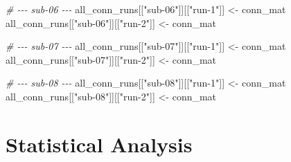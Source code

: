 \documentclass[
]{article}
\newenvironment{Shaded}{\begin{snugshade}}{\end{snugshade}}
\newcommand{\CommentTok}[1]{\textcolor[rgb]{0.56,0.35,0.01}{\textit{#1}}}
\newcommand{\FunctionTok}[1]{\textcolor[rgb]{0.13,0.29,0.53}{\textbf{#1}}}
\newcommand{\NormalTok}[1]{#1}
\newcommand{\OtherTok}[1]{\textcolor[rgb]{0.56,0.35,0.01}{#1}}
\newcommand{\StringTok}[1]{\textcolor[rgb]{0.31,0.60,0.02}{#1}}
\begin{document}
\begin{Shaded}
\begin{Highlighting}[]
\CommentTok{\# {-}{-}{-} sub{-}06 {-}{-}{-}}
\NormalTok{all\_conn\_runs[[}\StringTok{"sub{-}06"}\NormalTok{]][[}\StringTok{"run{-}1"}\NormalTok{]] }\OtherTok{\textless{}{-}}\NormalTok{ conn\_mat}
\NormalTok{all\_conn\_runs[[}\StringTok{"sub{-}06"}\NormalTok{]][[}\StringTok{"run{-}2"}\NormalTok{]] }\OtherTok{\textless{}{-}}\NormalTok{ conn\_mat}

\CommentTok{\# {-}{-}{-} sub{-}07 {-}{-}{-}}
\NormalTok{all\_conn\_runs[[}\StringTok{"sub{-}07"}\NormalTok{]][[}\StringTok{"run{-}1"}\NormalTok{]] }\OtherTok{\textless{}{-}}\NormalTok{ conn\_mat}
\NormalTok{all\_conn\_runs[[}\StringTok{"sub{-}07"}\NormalTok{]][[}\StringTok{"run{-}2"}\NormalTok{]] }\OtherTok{\textless{}{-}}\NormalTok{ conn\_mat}

\CommentTok{\# {-}{-}{-} sub{-}08 {-}{-}{-}}
\NormalTok{all\_conn\_runs[[}\StringTok{"sub{-}08"}\NormalTok{]][[}\StringTok{"run{-}1"}\NormalTok{]] }\OtherTok{\textless{}{-}}\NormalTok{ conn\_mat}
\NormalTok{all\_conn\_runs[[}\StringTok{"sub{-}08"}\NormalTok{]][[}\StringTok{"run{-}2"}\NormalTok{]] }\OtherTok{\textless{}{-}}\NormalTok{ conn\_mat}
\end{Highlighting}
\end{Shaded}

\begin{Shaded}
\end{Shaded}

\section{Statistical Analysis}\label{statistical-analysis}
\end{document}
